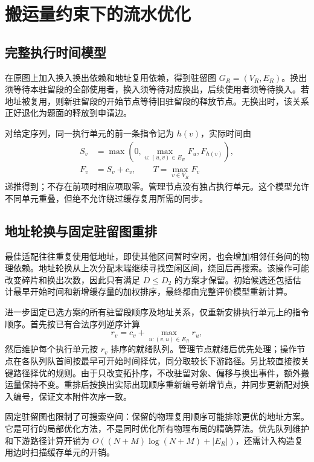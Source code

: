 \section{搬运量约束下的流水优化}
\subsection{完整执行时间模型}
在原图上加入换入换出依赖和地址复用依赖，得到驻留图 $G_R=(V_R,E_R)$。换出须等待本驻留段的全部使用者，换入须等待对应换出，后续使用者须等待换入。若地址被复用，则新驻留段的开始节点等待旧驻留段的释放节点。无换出时，该关系正好退化为题面的释放到申请边。

对给定序列，同一执行单元的前一条指令记为 $h(v)$，实际时间由
\begin{align}
S_v &= \max\left(0,\max_{u:(u,v)\in E_R}F_u,F_{h(v)}\right),\\
F_v &= S_v+c_v,\qquad T=\max_{v\in V_R}F_v
\end{align}
递推得到；不存在前项时相应项取零。管理节点没有独占执行单元。这个模型允许不同单元重叠，但绝不允许绕过缓存复用所需的同步。

\subsection{地址轮换与固定驻留图重排}
最佳适配往往重复使用低地址，即使其他区间暂时空闲，也会增加相邻任务间的物理依赖。地址轮换从上次分配末端继续寻找空闲区间，绕回后再搜索。该操作可能改变碎片和换出次数，因此只有满足 $D\le D_2$ 的方案才保留。初始候选还包括估计最早开始时间和新增缓存量的加权排序，最终都由完整评价模型重新计算。

进一步固定已选方案的所有驻留段顺序及地址关系，仅重新安排执行单元上的指令顺序。首先按已有合法序列逆序计算
\begin{equation}r_v=c_v+\max_{u:(v,u)\in E_R}r_u,\end{equation}
然后维护每个执行单元按 $r_v$ 排序的就绪队列。管理节点就绪后优先处理；操作节点在各队列队首间按最早可开始时间择优，同分取较长下游路径。另比较直接按关键路径择优的规则。由于只改变拓扑序，不改驻留对象、偏移与换出事件，额外搬运量保持不变。重排后按换出实际出现顺序重新编号新增节点，并同步更新配对换入编号，保证文本附件次序一致。

固定驻留图也限制了可搜索空间：保留的物理复用顺序可能排除更优的地址方案。它是可行的局部优化方法，不是同时优化所有物理布局的精确算法。优先队列维护和下游路径计算开销为 $O((N+M)\log(N+M)+|E_R|)$，还需计入构造复用边时扫描缓存单元的开销。

